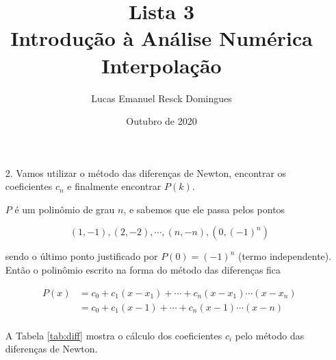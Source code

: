 \documentclass{article}
\title{Lista 3 \\
\large Introdução à Análise Numérica \\
Interpolação}
\author{Lucas Emanuel Resck Domingues}
\date{Outubro de 2020}
\begin{document}
    \maketitle

    \begin{enumerate}
        \item[2.] Vamos utilizar o método das diferenças de Newton,
            encontrar os coeficientes $c_n$ e finalmente encontrar $P(k)$.

            $P$ é um polinômio de grau $n$, e sabemos que ele passa
            pelos pontos

            $$(1, -1), (2, -2), \cdots, (n, -n), (0, (-1)^n)$$

            sendo o último ponto justificado por $P(0) = (-1)^n$
            (termo independente).
            Então o polinômio escrito na forma do método das diferenças fica

            \begin{align*}
                P(x) &= c_0 + c_1 (x - x_1) + \cdots + c_n (x - x_1)\cdots(x - x_n) \\
                &= c_0 + c_1 (x - 1) + \cdots + c_n (x - 1)\cdots(x - n) \\
            \end{align*}

            A Tabela \ref{tab:diff} mostra o cálculo dos coeficientes $c_i$
            pelo método das diferenças de Newton.

            

\end{enumerate}
\end{document}
